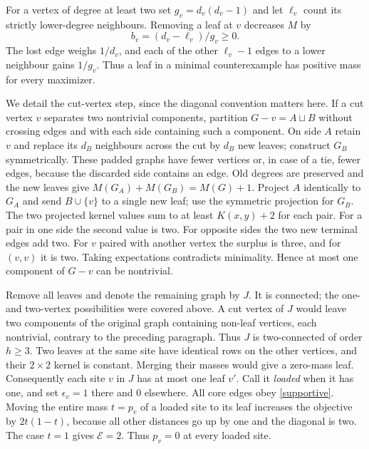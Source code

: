 \documentclass[11pt,a4paper]{article}
\theoremstyle{remark}\newtheorem*{remark}{Remark}
\begin{document}
For a vertex of degree at least two set $g_v=d_v(d_v-1)$ and let $\ell_v$ count its strictly lower-degree neighbours. Removing a leaf at $v$ decreases $M$ by
\begin{equation}
 b_v=(d_v-\ell_v)/g_v\ge0.\label{bleaf}
\end{equation}
The lost edge weighs $1/d_v$, and each of the other $\ell_v-1$ edges to a lower neighbour gains $1/g_v$. Thus a leaf in a minimal counterexample has positive mass for every maximizer.

We detail the cut-vertex step, since the diagonal convention matters here. If a cut vertex $v$ separates two nontrivial components, partition $G-v=A\sqcup B$ without crossing edges and with each side containing such a component. On side $A$ retain $v$ and replace its $d_B$ neighbours across the cut by $d_B$ new leaves; construct $G_B$ symmetrically. These padded graphs have fewer vertices or, in case of a tie, fewer edges, because the discarded side contains an edge. Old degrees are preserved and the new leaves give $M(G_A)+M(G_B)=M(G)+1$. Project $A$ identically to $G_A$ and send $B\cup\{v\}$ to a single new leaf; use the symmetric projection for $G_B$. The two projected kernel values sum to at least $K(x,y)+2$ for each pair. For a pair in one side the second value is two. For opposite sides the two new terminal edges add two. For $v$ paired with another vertex the surplus is three, and for $(v,v)$ it is two. Taking expectations contradicts minimality. Hence at most one component of $G-v$ can be nontrivial.

Remove all leaves and denote the remaining graph by $J$. It is connected; the one- and two-vertex possibilities were covered above. A cut vertex of $J$ would leave two components of the original graph containing non-leaf vertices, each nontrivial, contrary to the preceding paragraph. Thus $J$ is two-connected of order $h\ge3$. Two leaves at the same site have identical rows on the other vertices, and their $2\times2$ kernel is constant. Merging their masses would give a zero-mass leaf. Consequently each site $v$ in $J$ has at most one leaf $v'$. Call it \emph{loaded} when it has one, and set $\epsilon_v=1$ there and $0$ elsewhere. All core edges obey \eqref{supportive}. Moving the entire mass $t=p_v$ of a loaded site to its leaf increases the objective by $2t(1-t)$, because all other distances go up by one and the diagonal is two. The case $t=1$ gives $\mathcal E=2$. Thus $p_v=0$ at every loaded site.
\end{document}
